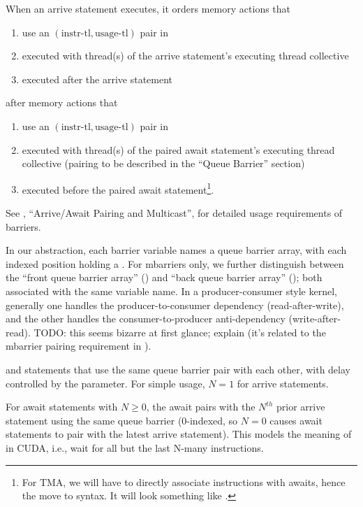 \filbreak
When an arrive statement executes, it orders memory actions that
\begin{enumerate}
  \item use an $(\text{instr-tl}, \text{usage-tl})$ pair in 
  \item executed with thread(s) of the arrive statement's executing thread collective
  \item executed after the arrive statement
\end{enumerate}
\filbreak
after memory actions that
\begin{enumerate}
  \item use an $(\text{instr-tl}, \text{usage-tl})$ pair in 
  \item executed with thread(s) of the paired await statement's executing thread collective (pairing to be described in the ``Queue Barrier'' section)
  \item executed before the paired await statement\footnote{For TMA, we will have to directly associate instructions with awaits, hence the move to \lighttt{>>} syntax. It will look something like .}.
\end{enumerate}

\filbreak
See , ``Arrive/Await Pairing and Multicast'', for detailed usage requirements of barriers.

\filbreak
{} In our abstraction, each barrier variable names a queue barrier array, with each indexed position holding a .
For mbarriers only, we further distinguish between the ``front queue barrier array'' () and ``back queue barrier array'' (); both associated with the same variable name.
In a producer-consumer style kernel, generally one handles the producer-to-consumer dependency (read-after-write), and the other handles the consumer-to-producer anti-dependency (write-after-read).
TODO: this seems bizarre at first glance; explain (it's related to the mbarrier pairing requirement in ).

\filbreak
{} and  statements that use the same queue barrier pair with each other, with delay controlled by the  parameter. For simple usage, $N = 1$ for arrive statements.

\filbreak
For await statements with $N \ge 0$, the await pairs with the $N^{th}$ prior arrive statement using the same queue barrier
(0-indexed, so $N = 0$ causes await statements to pair with the latest arrive statement).
This models the meaning of  in CUDA, i.e., wait for all but the last N-many  instructions.

